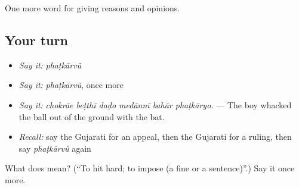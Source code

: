 \begin{grammarlens}[title={What you've built}]
One more word for giving reasons and opinions.
\end{grammarlens}

\subsection*{Your turn}
\begin{itemize}
\raggedright
  \item \emph{Say it:} \emph{phaṭkārvũ}
  \item \emph{Say it:} \emph{phaṭkārvũ}, once more
  \item \emph{Say it:} \emph{chokrāe beṭthī daḍo medānnī bahār phaṭkāryo.} — The boy whacked the ball out of the ground with the bat.
  \item \emph{Recall:} say the Gujarati for an appeal, then the Gujarati for a ruling, then say \emph{phaṭkārvũ} again
\end{itemize}

\begin{tcolorbox}[breakable,colback=teal!4,colframe=teal!35!black,title={Before you move on}]
What does  mean? (\textquotedblleft{}To hit hard; to impose (a fine or a sentence)\textquotedblright{}.) Say it once more.
\end{tcolorbox}
